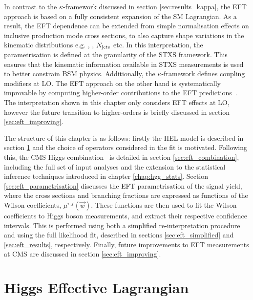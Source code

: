 In contrast to the $\kappa$-framework discussed in section \ref{sec:results_kappa}, the EFT approach is based on a fully consistent expansion of the SM Lagrangian. As a result, the EFT dependence can be extended from simple normalisation effects on inclusive production mode cross sections, to also capture shape variations in the kinematic distributions e.g. \ptH, \mjj, $N_{\rm{jets}}$ etc. In this interpretation, the parametrisation is defined at the granularity of the STXS framework. This ensures that the kinematic information available in STXS measurements is used to better constrain BSM physics. Additionally, the $\kappa$-framework defines coupling modifiers at LO. The EFT approach on the other hand is systematically improvable by computing higher-order contributions to the EFT predictions~\cite{Degrande:2020evl}. The interpretation shown in this chapter only considers EFT effects at LO, however the future transition to higher-orders is briefly discussed in section \ref{sec:eft_improving}.

The structure of this chapter is as follows: firstly the HEL model is described in section \ref{sec:eft_hel} and the choice of operators considered in the fit is motivated. Following this, the CMS Higgs combination~\cite{CMS-PAS-HIG-19-005} is detailed in section \ref{sec:eft_combination}, including the full set of input analyses and the extension to the statistical inference techniques introduced in chapter \ref{chap:hgg_stats}. Section \ref{sec:eft_parametrisation} discusses the EFT parametrisation of the signal yield, where the cross sections and branching fractions are expressed as functions of the Wilson coefficients, $\mu^{i,f}(\vec{w})$. These functions are then used to fit the Wilson coefficients to Higgs boson measurements, and extract their respective confidence intervals. This is performed using both a simplified re-interpretation procedure and using the full likelihood fit, described in sections \ref{sec:eft_simplified} and \ref{sec:eft_results}, respectively. Finally, future improvements to EFT measurements at CMS are discussed in section \ref{sec:eft_improving}.

\section{Higgs Effective Lagrangian}\label{sec:eft_hel}


